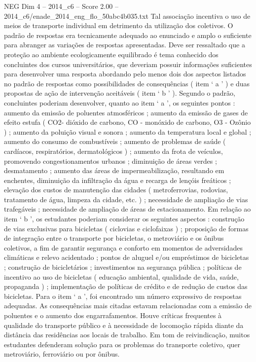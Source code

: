 \begin{textsample}{NEG Dim 4 – 2014\_c6 – Score 2.00 – 2014\_c6/enade\_2014\_eng\_flo\_50abc4b035.txt}
Tal associação incentiva o uso de meios de transporte individual em detrimento da utilização dos coletivos.
O padrão de respostas era tecnicamente adequado ao enunciado e amplo o suficiente para abranger as variações de respostas apresentadas.
Deve ser ressaltado que a proteção ao ambiente ecologicamente equilibrado é tema conhecido dos concluintes dos cursos universitários, que deveriam possuir informações suficientes para desenvolver uma resposta abordando pelo menos dois dos aspectos listados no padrão de respostas como possibilidades de consequências ( item ‘ a ’ ) e duas propostas de ação de intervenção aceitáveis ( item ‘ b ’ ).
Segundo o padrão, concluintes poderiam desenvolver, quanto ao item ‘ a ’, os seguintes pontos : aumento da emissão de poluentes atmosféricos ; aumento da emissão de gases de efeito estufa ( CO2- dióxido de carbono, CO - monóxido de carbono, O3 - Ozônio ) ; aumento da poluição visual e sonora ; aumento da temperatura local e global ; aumento do consumo de combustíveis ; aumento de problemas de saúde ( cardíacos, respiratórios, dermatológicos ) ; aumento da frota de veículos, promovendo congestionamentos urbanos ; diminuição de áreas verdes ; desmatamento ; aumento das áreas de impermeabilização, resultando em enchentes, diminuição da infiltração da água e recarga de lençóis freáticos ; elevação dos custos de manutenção das cidades ( metroferrovias, rodovias, tratamento de água, limpeza da cidade, etc. ) ; necessidade de ampliação de vias trafegáveis ; necessidade de ampliação de áreas de estacionamento.
Em relação ao item ‘ b ’, os estudantes poderiam considerar os seguintes aspectos : construção de vias exclusivas para bicicletas ( ciclovias e ciclofaixas ) ; proposição de formas de integração entre o transporte por bicicletas, o metroviário e os ônibus coletivos, a fim de garantir segurança e conforto em momentos de adversidades climáticas e relevo acidentado ; pontos de aluguel e/ou empréstimos de bicicletas ; construção de bicicletários ; investimentos na segurança pública ; políticas de incentivo ao uso de bicicletas ( educação ambiental, qualidade de vida, saúde, propaganda ) ; implementação de políticas de crédito e de redução de custos das bicicletas.
Para o item ‘ a ’, foi encontrado um número expressivo de respostas adequadas.
As consequências mais citadas estavam relacionadas com a emissão de poluentes e o aumento dos engarrafamentos.
Houve críticas frequentes à qualidade do transporte público e à necessidade de locomoção rápida diante da distância das residências aos locais de trabalho.
Em tom de reivindicação, muitos estudantes defenderam solução para os problemas do transporte coletivo, quer metroviário, ferroviário ou por ônibus.

\end{textsample}
